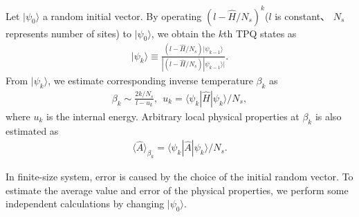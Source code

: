 Let $|\psi_{0}\rangle$ a random initial vector.
By operating $(l-\hat{H}/N_{s})^{k}$($l$ is constant、
$N_{s}$ represents number of sites) 
to $|\psi_{0}\rangle$,
we obtain the $k$th TPQ states as
\begin{align}
|\psi_{k}\rangle \equiv \frac{(l-\hat{H}/N_{s})|\psi_{k-1}\rangle}{|(l-\hat{H}/N_{s})|\psi_{k-1}\rangle|}.
\end{align}
From  $|\psi_{k}\rangle$, we estimate corresponding inverse temperature $\beta_{k}$ as
\begin{align}
\beta_{k}\sim \frac{2k/N_{s}}{l-u_{k}},~~
u_{k} = \langle \psi_{k}|\hat{H}|\psi_{k}\rangle/N_{s},
\end{align}
where $u_{k}$ is the internal energy.
Arbitrary local physical properties at $\beta_{k}$ is also estimated as
\begin{align}
\langle \hat{A}\rangle_{\beta_{k}} =  \langle \psi_{k}|\hat{A}|\psi_{k}\rangle/N_{s}.
\end{align}

In finite-size system,
error is caused by the choice of the initial random vector.
To estimate the average value and error of the physical properties,
we perform some independent calculations by changing $|\psi_{0}\rangle$.
